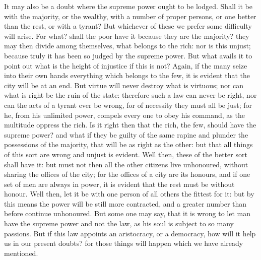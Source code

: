 It may also be a doubt where the supreme power ought to be lodged. Shall
it be with the majority, or the wealthy, with a number of proper persons,
or one better than the rest, or with a tyrant? But whichever of these we
prefer some difficulty will arise. For what? shall the poor have it
because they are the majority? they may then divide among themselves, what
belongs to the rich: nor is this unjust; because truly it has been so
judged by the supreme power. But what avails it to point out what is the
height of injustice if this is not? Again, if the many seize into their
own hands everything which belongs to the few, it is evident that the city
will be at an end. But virtue will never destroy what is virtuous; nor can
what is right be the ruin of the state: therefore such a law can never be
right, nor can the acts of a tyrant ever be wrong, for of necessity they
must all be just; for he, from his unlimited power, compels every one to
obey his command, as the multitude oppress the rich. Is it right then that
the rich, the few, should have the supreme power? and what if they be
guilty of the same rapine and plunder the possessions of the majority,
that will be as right as the other: but that all things of this sort are
wrong and unjust is evident. Well then, these of the better sort shall
have it: but must not then all the other citizens live unhonoured, without
sharing the offices of the city; for the offices of a city are its
honours, and if one set of men are always in power, it is evident that the
rest must be without honour. Well then, let it be with one person of all
others the fittest for it: but by this means the power will be still more
contracted, and a greater number than before continue unhonoured. But some
one may say, that it is wrong to let man have the supreme power and not
the law, as his soul is subject to so many passions. But if this law
appoints an aristocracy, or a democracy, how will it help us in our
present doubts? for those things will happen which we have already
mentioned.


